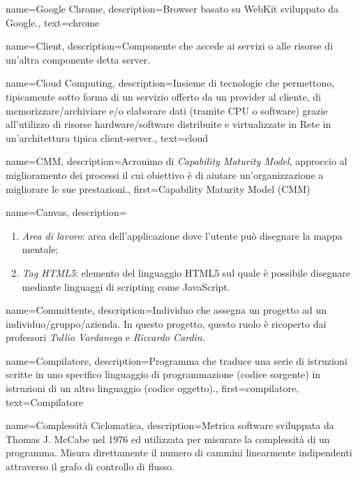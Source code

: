{
name={Google Chrome},
description={Browser basato su WebKit sviluppato da Google.},
text={chrome}
}

{
name={Client},
description={Componente che accede ai servizi o alle risorse di un'altra componente detta server.}
}

{
name={Cloud Computing},
description={Insieme di tecnologie che permettono, tipicamente sotto forma di un servizio offerto da un provider al cliente, di memorizzare/archiviare e/o elaborare dati (tramite CPU o software) grazie all'utilizzo di risorse hardware/software distribuite e virtualizzate in Rete in un'architettura tipica client-server.},
text={cloud}
}

{
name={CMM},
description={Acronimo di \textit{Capability Maturity Model}, approccio al miglioramento dei processi il cui obiettivo è di aiutare un'organizzazione a migliorare le sue prestazioni.},
first={Capability Maturity Model (CMM)}
}

{
name={Canvas},
description={\begin{enumerate}
\item \textit{Area di lavoro}: area dell’applicazione dove l’utente può disegnare la mappa mentale;
\item \textit{Tag HTML5}: elemento del linguaggio HTML5 sul quale è possibile disegnare mediante linguaggi di scripting come JavaScript.
\end{enumerate}
}
}

{
name={Committente},
description={Individuo che assegna un progetto ad un individuo/gruppo/azienda. In questo progetto, questo ruolo è ricoperto dai professori \textit{Tullio Vardanega} e \textit{Riccardo Cardin}.}
}

{
name={Compilatore},
description={Programma che traduce una serie di istruzioni scritte in uno specifico linguaggio di programmazione (codice sorgente) in istruzioni di un altro linguaggio (codice oggetto).},
first={compilatore},
text={Compilatore}
}

{
name={Complessità Ciclomatica},
description={Metrica software sviluppata da Thomas J. McCabe nel 1976 ed utilizzata per misurare la complessità di un programma. Misura direttamente il numero di cammini linearmente indipendenti attraverso il grafo di controllo di flusso.}
}

